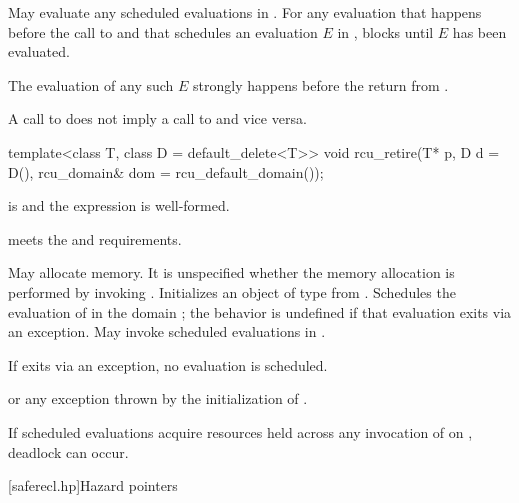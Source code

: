 \begin{itemdescr}
\pnum
\effects
May evaluate any scheduled evaluations in .
For any evaluation that happens before the call to  and
that schedules an evaluation $E$ in ,
blocks until $E$ has been evaluated.

\pnum
\sync
The evaluation of any such $E$
strongly happens before the return from .

\begin{note}
A call to  does not imply
a call to  and vice versa.
\end{note}
\end{itemdescr}

%
\begin{itemdecl}
template<class T, class D = default_delete<T>>
void rcu_retire(T* p, D d = D(), rcu_domain& dom = rcu_default_domain());
\end{itemdecl}

\begin{itemdescr}
\pnum
\mandates
{} is  and
the expression  is well-formed.

\pnum
\expects
{} meets the  and
 requirements.

\pnum
\effects
May allocate memory.
It is unspecified whether the memory allocation
is performed by invoking .
Initializes an object  of type  from .
Schedules the evaluation of  in the domain ;
the behavior is undefined if that evaluation exits via an exception.
May invoke scheduled evaluations in .
\begin{note}
If  exits via an exception, no evaluation
is scheduled.
\end{note}

\pnum
\throws
{} or any exception thrown by the initialization of .

\pnum
\begin{note}
If scheduled evaluations acquire resources
held across any invocation of  on ,
deadlock can occur.
\end{note}
\end{itemdescr}

[saferecl.hp]{Hazard pointers}

